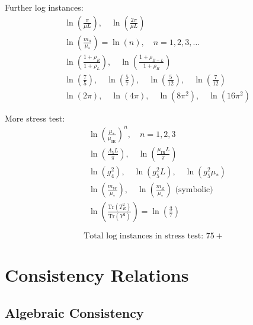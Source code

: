 \documentclass[11pt,a4paper]{article}
\theoremstyle{definition}
\begin{document}
Further log instances:
\begin{align}
\label{eq:log_ext_11}
&\ln\left(\frac{\pi}{\mu L}\right), \quad \ln\left(\frac{2\pi}{\mu L}\right) \\
\label{eq:log_ext_12}
&\ln\left(\frac{m_n}{\mu_*}\right) = \ln(n), \quad n = 1, 2, 3, \ldots \\
\label{eq:log_ext_13}
&\ln\left(\frac{1 + \rho_R}{1 + \rho_L}\right), \quad \ln\left(\frac{1 + \rho_{B-L}}{1 + \rho_R}\right) \\
\label{eq:log_ext_14}
&\ln\left(\frac{7}{5}\right), \quad \ln\left(\frac{5}{7}\right), \quad \ln\left(\frac{5}{12}\right), \quad \ln\left(\frac{7}{12}\right) \\
\label{eq:log_ext_15}
&\ln(2\pi), \quad \ln(4\pi), \quad \ln(8\pi^2), \quad \ln(16\pi^2)
\end{align}

More stress test:
\begin{align}
\label{eq:log_ext_16}
&\ln\left(\frac{\mu_*}{\mu_{\text{IR}}}\right)^n, \quad n = 1, 2, 3 \\
\label{eq:log_ext_17}
&\ln\left(\frac{\Lambda_5 L}{\pi}\right), \quad \ln\left(\frac{\mu_{\text{IR}} L}{\pi}\right) \\
\label{eq:log_ext_18}
&\ln(g_4^2), \quad \ln(g_5^2 L), \quad \ln(g_5^2\mu_*) \\
\label{eq:log_ext_19}
&\ln\left(\frac{m_W}{\mu_*}\right), \quad \ln\left(\frac{m_Z}{\mu_*}\right) \text{ (symbolic)} \\
\label{eq:log_ext_20}
&\ln\left(\frac{\text{Tr}(T^2_R)}{\text{Tr}(Y^2)}\right) = \ln\left(\frac{3}{7}\right)
\end{align}

\begin{equation}
\label{eq:log_stress_count}
\text{Total log instances in stress test: } 75+
\end{equation}

\section{Consistency Relations}
\label{app:consistency}

\subsection{Algebraic Consistency}
\label{subsec:alg_consist}
\end{document}
